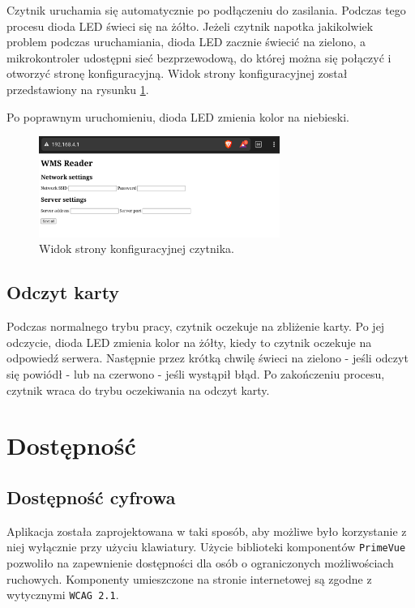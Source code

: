 Czytnik uruchamia się automatycznie po podłączeniu do zasilania. Podczas tego procesu dioda LED świeci się na żółto. Jeżeli czytnik napotka jakikolwiek problem podczas uruchamiania, dioda LED zacznie świecić na zielono, a mikrokontroler udostępni sieć bezprzewodową, do której można się połączyć i otworzyć stronę konfiguracyjną. Widok strony konfiguracyjnej został przedstawiony na rysunku \ref{fig:readerConfig}.

Po poprawnym uruchomieniu, dioda LED zmienia kolor na niebieski.

\begin{figure}[H]
    \centering
    \includegraphics[width=0.7\textwidth, frame]{graf/readerSetup.jpg}
    \caption{Widok strony konfiguracyjnej czytnika.}
    \label{fig:readerConfig}
\end{figure}

\subsection{Odczyt karty}

Podczas normalnego trybu pracy, czytnik oczekuje na zbliżenie karty. Po jej odczycie, dioda LED zmienia kolor na żółty, kiedy to czytnik oczekuje na odpowiedź serwera. Następnie przez krótką chwilę świeci na zielono - jeśli odczyt się powiódł - lub na czerwono - jeśli wystąpił błąd. Po zakończeniu procesu, czytnik wraca do trybu oczekiwania na odczyt karty.

\section{Dostępność}

\subsection{Dostępność cyfrowa}

Aplikacja została zaprojektowana w taki sposób, aby możliwe było korzystanie z niej wyłącznie przy użyciu klawiatury. Użycie biblioteki komponentów \texttt{PrimeVue} pozwoliło na zapewnienie dostępności dla osób o ograniczonych możliwościach ruchowych. Komponenty umieszczone na stronie internetowej są zgodne z wytycznymi \texttt{WCAG 2.1}. \cite{bib:WCAG21}

